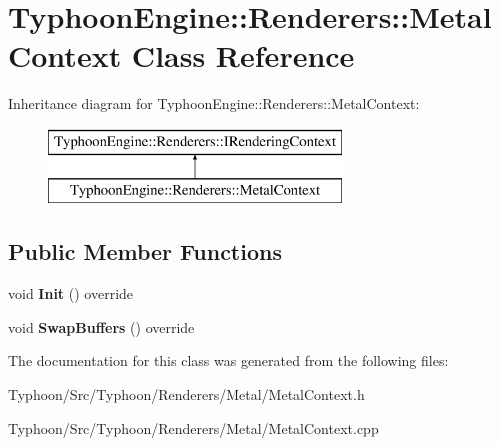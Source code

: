 \hypertarget{class_typhoon_engine_1_1_renderers_1_1_metal_context}{}\section{Typhoon\+Engine\+::Renderers\+::Metal\+Context Class Reference}
\label{class_typhoon_engine_1_1_renderers_1_1_metal_context}
Inheritance diagram for Typhoon\+Engine\+::Renderers\+::Metal\+Context\+:\begin{figure}[H]
\begin{center}
\leavevmode
\includegraphics[height=2.000000cm]{class_typhoon_engine_1_1_renderers_1_1_metal_context}
\end{center}
\end{figure}
\subsection*{Public Member Functions}
\begin{DoxyCompactItemize}
\item 
\mbox{\label{class_typhoon_engine_1_1_renderers_1_1_metal_context_a11c439d151efc5b989a4793c06884349}} 
void {\bfseries Init} () override
\item 
\mbox{\label{class_typhoon_engine_1_1_renderers_1_1_metal_context_ab6312e6874c60fc03cee5a340e745d3c}} 
void {\bfseries Swap\+Buffers} () override
\end{DoxyCompactItemize}


The documentation for this class was generated from the following files\+:\begin{DoxyCompactItemize}
\item 
Typhoon/\+Src/\+Typhoon/\+Renderers/\+Metal/Metal\+Context.\+h\item 
Typhoon/\+Src/\+Typhoon/\+Renderers/\+Metal/Metal\+Context.\+cpp\end{DoxyCompactItemize}
